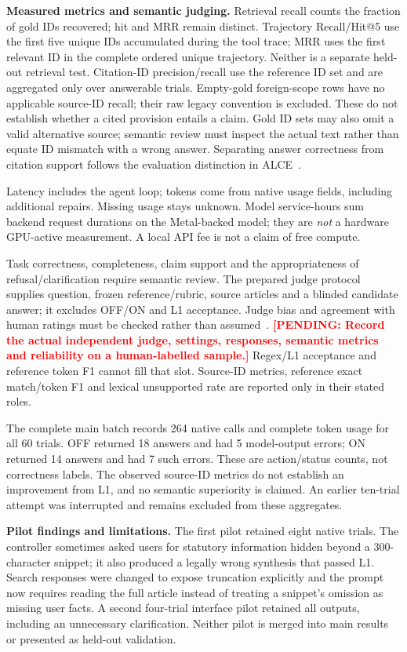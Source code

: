 \documentclass[a4paper,11pt]{article}
\newcommand{\hdr}[1]{\vspace{2pt}\noindent\textbf{#1}}
\newcommand{\pending}[1]{\textcolor{red}{\textbf{[PENDING: #1]}}}
\begin{document}
\hdr{Measured metrics and semantic judging.}
Retrieval recall counts the fraction of gold IDs recovered; hit and MRR remain distinct. Trajectory Recall/Hit@5 use the first five unique IDs accumulated during the tool trace; MRR uses the first relevant ID in the complete ordered unique trajectory. Neither is a separate held-out retrieval test. Citation-ID precision/recall use the reference ID set and are aggregated only over answerable trials. Empty-gold foreign-scope rows have no applicable source-ID recall; their raw legacy convention is excluded. These do not establish whether a cited provision entails a claim. Gold ID sets may also omit a valid alternative source; semantic review must inspect the actual text rather than equate ID mismatch with a wrong answer. Separating answer correctness from citation support follows the evaluation distinction in ALCE~\citep{gao2023alce}.

Latency includes the agent loop; tokens come from native usage fields, including additional repairs. Missing usage stays unknown. Model service-hours sum backend request durations on the Metal-backed model; they are \emph{not} a hardware GPU-active measurement. A local API fee is not a claim of free compute.

Task correctness, completeness, claim support and the appropriateness of refusal/clarification require semantic review. The prepared judge protocol supplies question, frozen reference/rubric, source articles and a blinded candidate answer; it excludes OFF/ON and L1 acceptance. Judge bias and agreement with human ratings must be checked rather than assumed~\citep{zheng2023judge}. \pending{Record the actual independent judge, settings, responses, semantic metrics and reliability on a human-labelled sample.} Regex/L1 acceptance and reference token F1 cannot fill that slot. Source-ID metrics, reference exact match/token F1 and lexical unsupported rate are reported only in their stated roles.


The complete main batch records 264 native calls and complete token usage for all 60 trials. OFF returned 18 answers and had 5 model-output errors; ON returned 14 answers and had 7 such errors. These are action/status counts, not correctness labels. The observed source-ID metrics do not establish an improvement from L1, and no semantic superiority is claimed. An earlier ten-trial attempt was interrupted and remains excluded from these aggregates.


\hdr{Pilot findings and limitations.}
The first pilot retained eight native trials. The controller sometimes asked users for statutory information hidden beyond a 300-character snippet; it also produced a legally wrong synthesis that passed L1. Search responses were changed to expose truncation explicitly and the prompt now requires reading the full article instead of treating a snippet's omission as missing user facts. A second four-trial interface pilot retained all outputs, including an unnecessary clarification. Neither pilot is merged into main results or presented as held-out validation.
\end{document}
